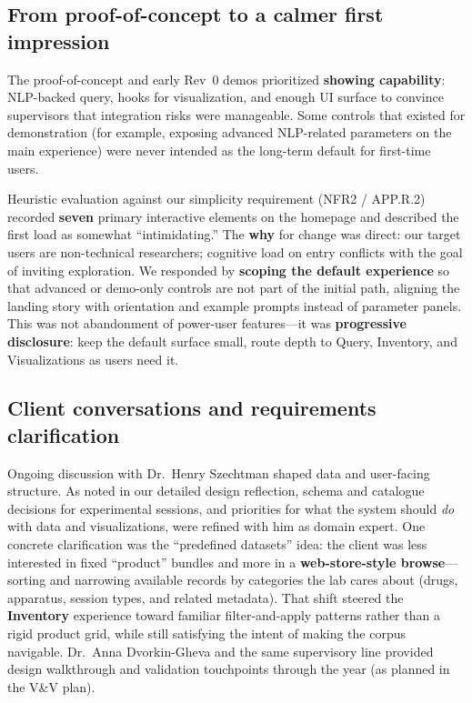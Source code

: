 \documentclass{article}
\begin{document}
\subsection{From proof-of-concept to a calmer first impression}

\par{The proof-of-concept and early Rev~0 demos prioritized \textbf{showing capability}: NLP-backed query, hooks for visualization, and enough UI surface to convince supervisors that integration risks were manageable. Some controls that existed for demonstration (for example, exposing advanced NLP-related parameters on the main experience) were never intended as the long-term default for first-time users.}

\par{Heuristic evaluation against our simplicity requirement (NFR2 / APP.R.2) recorded \textbf{seven} primary interactive elements on the homepage and described the first load as somewhat ``intimidating.'' The \textbf{why} for change was direct: our target users are non-technical researchers; cognitive load on entry conflicts with the goal of inviting exploration. We responded by \textbf{scoping the default experience} so that advanced or demo-only controls are not part of the initial path, aligning the landing story with orientation and example prompts instead of parameter panels. This was not abandonment of power-user features---it was \textbf{progressive disclosure}: keep the default surface small, route depth to Query, Inventory, and Visualizations as users need it.}

\subsection{Client conversations and requirements clarification}

\par{Ongoing discussion with Dr.~Henry Szechtman shaped data and user-facing structure. As noted in our detailed design reflection, schema and catalogue decisions for experimental sessions, and priorities for what the system should \emph{do} with data and visualizations, were refined with him as domain expert. One concrete clarification was the ``predefined datasets'' idea: the client was less interested in fixed ``product'' bundles and more in a \textbf{web-store-style browse}---sorting and narrowing available records by categories the lab cares about (drugs, apparatus, session types, and related metadata). That shift steered the \textbf{Inventory} experience toward familiar filter-and-apply patterns rather than a rigid product grid, while still satisfying the intent of making the corpus navigable. Dr.~Anna Dvorkin-Gheva and the same supervisory line provided design walkthrough and validation touchpoints through the year (as planned in the V\&V plan).}
\end{document}
